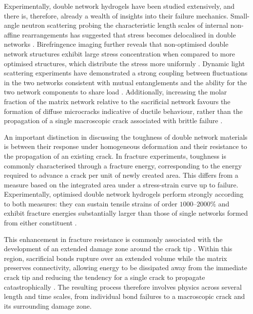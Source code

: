Experimentally, double network hydrogels have been studied extensively, and there is, therefore, already a wealth of insights into their failure mechanics. Small-angle neutron scattering probing the characteristic length scales of internal non-affine rearrangements has suggested that stress becomes delocalised in double networks \cite{ducrot_structure_2015, tominaga_molecular_2007}. Birefringence imaging further reveals that non-optimised double network structures exhibit large stress concentration when compared to more optimised structures, which distribute the stress more uniformly \cite{gong_double-network_2003, zheng_how_2021}. Dynamic light scattering experiments have demonstrated a strong coupling between fluctuations in the two networks consistent with mutual entanglements and the ability for the two network components to share load \cite{huang_importance_2007,Orr2026}. Additionally, increasing the molar fraction of the matrix network relative to the sacrificial network favours the formation of diffuse microcracks indicative of ductile behaviour, rather than the propagation of a single macroscopic crack associated with brittle failure \cite{fukao_effect_2020, ju_role_nodate}.

An important distinction in discussing the toughness of double network materials is between their response under homogeneous deformation and their resistance to the propagation of an existing crack. In fracture experiments, toughness is commonly characterised through a fracture energy, corresponding to the energy required to advance a crack per unit of newly created area. This differs from a measure based on the integrated area under a stress-strain curve up to failure. Experimentally, optimised double network hydrogels perform strongly according to both measures: they can sustain tensile strains of order $1000$--$2000\%$ \cite{gong_why_2010,ahmedBrittleDuctileTransition2014} and exhibit fracture energies substantially larger than those of single networks formed from either constituent \cite{tominaga_molecular_2007,xin_effect_2013,Creton50th2017}.

This enhancement in fracture resistance is commonly associated with the development of an extended damage zone around the crack tip \cite{brown_model_2007,tanaka_local_2007,zheng_how_2021,huang_importance_2007,ju_role_nodate,sanner_less_2025,Persson2024}. Within this region, sacrificial bonds rupture over an extended volume while the matrix preserves connectivity, allowing energy to be dissipated away from the immediate crack tip and reducing the tendency for a single crack to propagate catastrophically \cite{gong_why_2010,fukao_effect_2020,millereauMechanicsElastomericMolecular2018}. The resulting process therefore involves physics across several length and time scales, from individual bond failures to a macroscopic crack and its surrounding damage zone.

